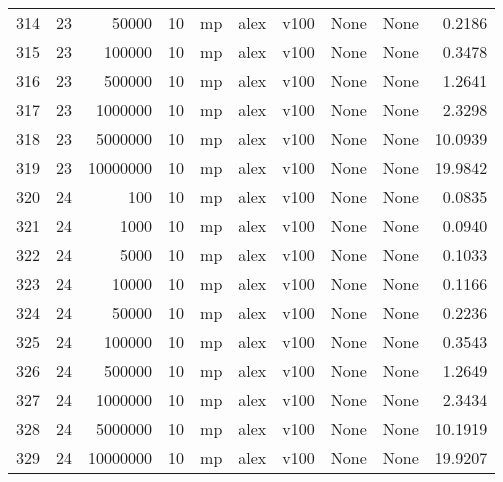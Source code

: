 \begin{tabular}{lrrrlllllr}
314 &  23 &     50000 &      10 &   mp &  alex &  v100 &  None &  None &   0.2186 \\
315 &  23 &    100000 &      10 &   mp &  alex &  v100 &  None &  None &   0.3478 \\
316 &  23 &    500000 &      10 &   mp &  alex &  v100 &  None &  None &   1.2641 \\
317 &  23 &   1000000 &      10 &   mp &  alex &  v100 &  None &  None &   2.3298 \\
318 &  23 &   5000000 &      10 &   mp &  alex &  v100 &  None &  None &  10.0939 \\
319 &  23 &  10000000 &      10 &   mp &  alex &  v100 &  None &  None &  19.9842 \\
320 &  24 &       100 &      10 &   mp &  alex &  v100 &  None &  None &   0.0835 \\
321 &  24 &      1000 &      10 &   mp &  alex &  v100 &  None &  None &   0.0940 \\
322 &  24 &      5000 &      10 &   mp &  alex &  v100 &  None &  None &   0.1033 \\
323 &  24 &     10000 &      10 &   mp &  alex &  v100 &  None &  None &   0.1166 \\
324 &  24 &     50000 &      10 &   mp &  alex &  v100 &  None &  None &   0.2236 \\
325 &  24 &    100000 &      10 &   mp &  alex &  v100 &  None &  None &   0.3543 \\
326 &  24 &    500000 &      10 &   mp &  alex &  v100 &  None &  None &   1.2649 \\
327 &  24 &   1000000 &      10 &   mp &  alex &  v100 &  None &  None &   2.3434 \\
328 &  24 &   5000000 &      10 &   mp &  alex &  v100 &  None &  None &  10.1919 \\
329 &  24 &  10000000 &      10 &   mp &  alex &  v100 &  None &  None &  19.9207 \\
\bottomrule
\end{tabular}
